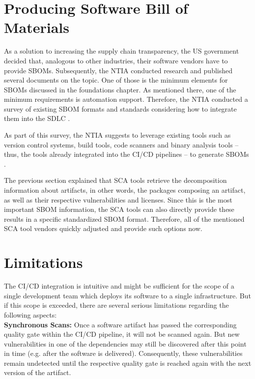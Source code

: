 \section{Producing Software Bill of Materials}
As a solution to increasing the supply chain transparency, the US government decided that, analogous to other industries, their software vendors have to provide SBOMs. Subsequently, the NTIA conducted research and published several documents on the topic. One of those is the minimum elements for SBOMs discussed in the foundations chapter. As mentioned there, one of the minimum requirements is automation support. Therefore, the NTIA conducted a survey of existing SBOM formats and standards considering how to integrate them into the SDLC \cite{SBOMSurvey}.\par
As part of this survey, the NTIA suggests to leverage existing tools such as version control systems, build tools, code scanners and binary analysis tools -- thus, the tools already integrated into the CI/CD pipelines -- to generate SBOMs \cite{SBOMSurvey}.\par
The previous section explained that SCA tools retrieve the decomposition information about artifacts, in other words, the packages composing an artifact, as well as their respective vulnerabilities and licenses. Since this is the most important SBOM information, the SCA tools can also directly provide these results in a specific standardized SBOM format. Therefore, all of the mentioned SCA tool vendors quickly adjusted and provide such options now.

\section{Limitations} \label{sec:Limitations}
The CI/CD integration is intuitive and might be sufficient for the scope of a single development team which deploys its software to a single infrastructure. But if this scope is exceeded, there are several serious limitations regarding the following aspects:\\

\noindent\textbf{Synchronous Scans:} Once a software artifact has passed the corresponding quality gate within the CI/CD pipeline, it will not be scanned again. But new vulnerabilities in one of the dependencies may still be discovered after this point in time (e.g. after the software is delivered). Consequently, these vulnerabilities remain undetected until the respective quality gate is reached again with the next version of the artifact.\\

